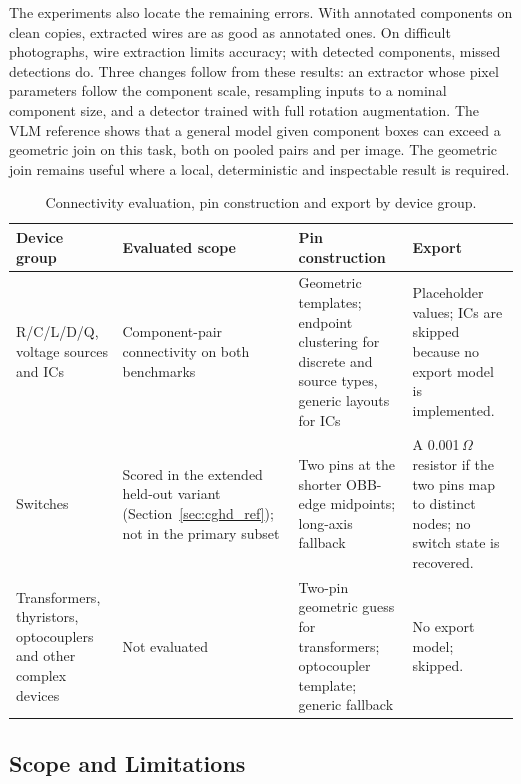 \documentclass[journal]{IEEEtran}
\begin{document}
The experiments also locate the remaining errors. With annotated components on clean copies, extracted wires are as good as annotated ones. On difficult photographs, wire extraction limits accuracy; with detected components, missed detections do. Three changes follow from these results: an extractor whose pixel parameters follow the component scale, resampling inputs to a nominal component size, and a detector trained with full rotation augmentation. The VLM reference shows that a general model given component boxes can exceed a geometric join on this task, both on pooled pairs and per image. The geometric join remains useful where a local, deterministic and inspectable result is required.

\begin{table}[t]
\caption{Connectivity evaluation, pin construction and export by device group.}
\label{tab:capabilities}
\centering
\footnotesize
\begin{tabular}{p{}p{}p{}p{}}
\toprule
\textbf{Device group} & \textbf{Evaluated scope} & \textbf{Pin construction} & \textbf{Export} \\
\midrule
R/C/L/D/Q, voltage sources and ICs & Component-pair connectivity on both benchmarks & Geometric templates; endpoint clustering for discrete and source types, generic layouts for ICs & Placeholder values; ICs are skipped because no export model is implemented. \\
Switches & Scored in the extended held-out variant (Section~\ref{sec:cghd_ref}); not in the primary subset & Two pins at the shorter OBB-edge midpoints; long-axis fallback & A 0.001\,$\Omega$ resistor if the two pins map to distinct nodes; no switch state is recovered. \\
Transformers, thyristors, optocouplers and other complex devices & Not evaluated & Two-pin geometric guess for transformers; optocoupler template; generic fallback & No export model; skipped. \\
\bottomrule
\end{tabular}
\end{table}

\subsection{Scope and Limitations}
\label{sec:limitations}
\end{document}
